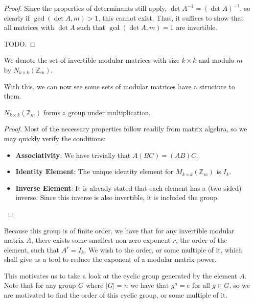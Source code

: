 \documentclass[a4paper, 12pt]{article}
\begin{document}
\begin{proof}
    Since the properties of determinants still apply, \( \det A^{-1} = (\det A)^{-1} \), so clearly if \( \gcd{(\det A, m)} > 1 \), this cannot exist. Thus, it suffices to show that all matrices with \( \det A \) such that \( \gcd(\det A, m) = 1 \) are invertible.

    \textcolor{WildStrawberry}{TODO.}
\end{proof}

\begin{notation}
    We denote the set of invertible modular matrices with size \( k \times k \) and modulo \( m \) by \( N_{k \times k}(\mathbb{Z}_m) \).
\end{notation}

With this, we can now see some sets of modular matrices have a structure to them.

\begin{theorem}
    \( N_{k \times k}(\mathbb{Z}_{m}) \) forms a group under multiplication.
\end{theorem}

\begin{proof}
    Most of the necessary properties follow readily from matrix algebra, so we may quickly verify the conditions:
    \begin{itemize}
        \item \textbf{Associativity}: We have trivially that \( A(BC) = (AB)C \).
        \item \textbf{Identity Element}: The unique identity element for \( M_{k \times k}(\mathbb{Z}_m) \) is \( I_k \).
        \item \textbf{Inverse Element}: It is already stated that each element has a (two-sided) inverse. Since this inverse is also invertible, it is included the group.
    \end{itemize}
\end{proof}

Because this group is of finite order, we have that for any invertible modular matrix \( A \), there exists some smallest non-zero exponent \( r \), the order of the element, such that \( A^r = I_k \). We wish to the order, or some multiple of it, which shall give us a tool to reduce the exponent of a modular matrix power.

This motivates us to take a look at the cyclic group generated by the element \( A \). Note that for any group \( G \) where \( | G | = n \) we have that \( g^n = e \) for all \( g \in G \), so we are motivated to find the order of this cyclic group, or some multiple of it.
\end{document}
